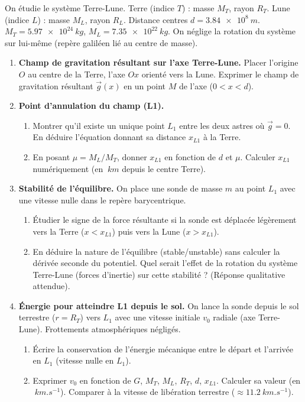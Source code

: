 \documentclass[11pt]{article}
\begin{document}
\begin{exercice}
On étudie le système Terre-Lune. Terre (indice $T$) : masse $M_T$, rayon $R_T$. Lune (indice $L$) : masse $M_L$, rayon $R_L$. Distance centres $d = \SI{3,84e8}{m}$. $M_T = \SI{5,97e24}{kg}$, $M_L = \SI{7,35e22}{kg}$. On néglige la rotation du système sur lui-même (repère galiléen lié au centre de masse).
\begin{enumerate}
    \item \textbf{Champ de gravitation résultant sur l'axe Terre-Lune.} Placer l'origine $O$ au centre de la Terre, l'axe $Ox$ orienté vers la Lune. Exprimer le champ de gravitation résultant $\vec{g}(x)$ en un point $M$ de l'axe ($0 < x < d$).
    \item \textbf{Point d'annulation du champ (L1).}
    \begin{enumerate}
        \item Montrer qu'il existe un unique point $L_1$ entre les deux astres où $\vec{g}=0$. En déduire l'équation donnant sa distance $x_{L1}$ à la Terre.
        \item En posant $\mu = M_L/M_T$, donner $x_{L1}$ en fonction de $d$ et $\mu$. Calculer $x_{L1}$ numériquement (en $\SI{}{km}$ depuis le centre Terre).
    \end{enumerate}
    \item \textbf{Stabilité de l'équilibre.} On place une sonde de masse $m$ au point $L_1$ avec une vitesse nulle dans le repère barycentrique.
    \begin{enumerate}
        \item Étudier le signe de la force résultante si la sonde est déplacée légèrement vers la Terre ($x < x_{L1}$) puis vers la Lune ($x > x_{L1}$).
        \item En déduire la nature de l'équilibre (stable/unstable) sans calculer la dérivée seconde du potentiel. Quel serait l'effet de la rotation du système Terre-Lune (forces d'inertie) sur cette stabilité ? (Réponse qualitative attendue).
    \end{enumerate}
    \item \textbf{Énergie pour atteindre L1 depuis le sol.} On lance la sonde depuis le sol terrestre ($r=R_T$) vers $L_1$ avec une vitesse initiale $v_0$ radiale (axe Terre-Lune). Frottements atmosphériques négligés.
    \begin{enumerate}
        \item Écrire la conservation de l'énergie mécanique entre le départ et l'arrivée en $L_1$ (vitesse nulle en $L_1$).
        \item Exprimer $v_0$ en fonction de $G$, $M_T$, $M_L$, $R_T$, $d$, $x_{L1}$. Calculer sa valeur (en $\SI{}{km.s^{-1}}$). Comparer à la vitesse de libération terrestre ($\approx \SI{11,2}{km.s^{-1}}$).
    \end{enumerate}
\end{enumerate}
\end{exercice}
\end{document}
